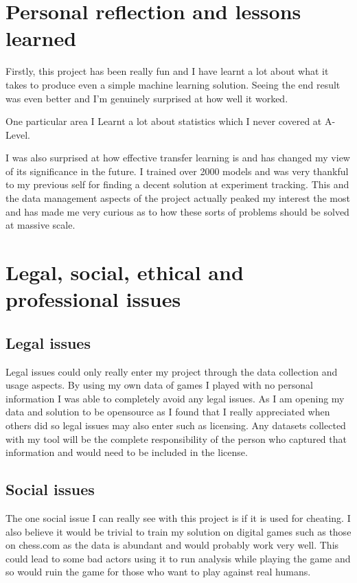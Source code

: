 \begin{appendices}
\section{Personal reflection and lessons learned}
Firstly, this project has been really fun and I have learnt a lot about what it takes to produce even a simple machine learning solution.  
Seeing the end result was even better and I'm genuinely surprised at how well it worked.

One particular area I Learnt a lot about statistics which I never covered at A-Level.

I was also surprised at how effective transfer learning is and has changed my view of its significance in the future.
I trained over 2000 models and was very thankful to my previous self for finding a decent solution at experiment tracking.  This and the data management aspects 
of the project actually peaked my interest the most and has made me very curious as to how these sorts of problems should be solved at massive scale.


\section{Legal, social, ethical and professional issues}

\subsection{Legal issues}
Legal issues could only really enter my project through the data collection and usage aspects.  By using my own data of games I played with no personal information 
I was able to completely avoid any legal issues.  As I am opening my data and solution to be opensource as I found that I really appreciated when others did so legal 
issues may also enter such as licensing.  Any datasets collected with my tool will be the complete responsibility of the person who captured that information and would 
need to be included in the license.

\subsection{Social issues}
The one social issue I can really see with this project is if it is used for cheating.  I also believe it would be trivial to train my solution on digital games such 
as those on chess.com as the data is abundant and would probably work very well.  This could lead to some bad actors using it to run analysis while playing the game 
and so would ruin the game for those who want to play against real humans.


\end{appendices}
